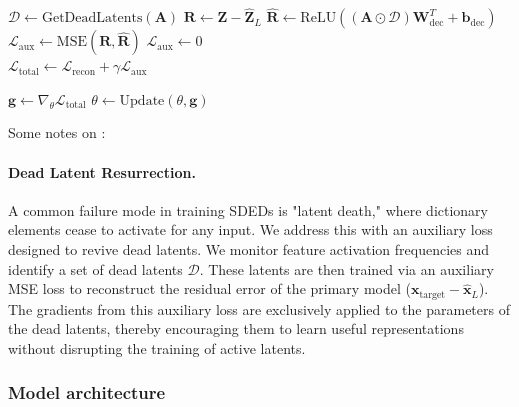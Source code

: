 \begin{algorithm}[bh]
\begin{algorithmic}[1]
    \Statex {}
    \State $\mathcal{D} \gets \text{GetDeadLatents}(\mathbf{A})$
     
        \State $\mathbf{R} \gets \mathbf{Z} - \hat{\mathbf{Z}}_L$ 
        \State $\hat{\mathbf{R}} \gets \text{ReLU}((\mathbf{A} \odot \mathcal{D}) \mathbf{W}_{\text{dec}}^T + \mathbf{b}_{\text{dec}})$ 
        \State $\mathcal{L}_{\text{aux}} \gets \text{MSE}(\mathbf{R}, \hat{\mathbf{R}})$ 
    \Else
        \State $\mathcal{L}_{\text{aux}} \gets 0$
    \EndIf
    \\
    \State $\mathcal{L}_{\text{total}} \gets \mathcal{L}_{\text{recon}} + \gamma \mathcal{L}_{\text{aux}}$ 

    \Statex {}
    \State $\mathbf{g} \gets \nabla_{\theta} \mathcal{L}_{\text{total}}$ 
    \State $\theta \gets \text{Update}(\theta, \mathbf{g})$ 
\EndProcedure
\end{algorithmic}
\end{algorithm}

Some notes on :

\paragraph{Dead Latent Resurrection.}
A common failure mode in training SDEDs is "latent death," where dictionary elements cease to activate for any input. We address this with an auxiliary loss designed to revive dead latents. We monitor feature activation frequencies and identify a set of dead latents $\mathcal{D}$. These latents are then trained via an auxiliary MSE loss to reconstruct the residual error of the primary model ($\mathbf{x}_{\text{target}} - \hat{\mathbf{x}}_L$). The gradients from this auxiliary loss are exclusively applied to the parameters of the dead latents, thereby encouraging them to learn useful representations without disrupting the training of active latents.

\subsubsection{Model architecture}
\label{subsubsection:model_architecture_details}

